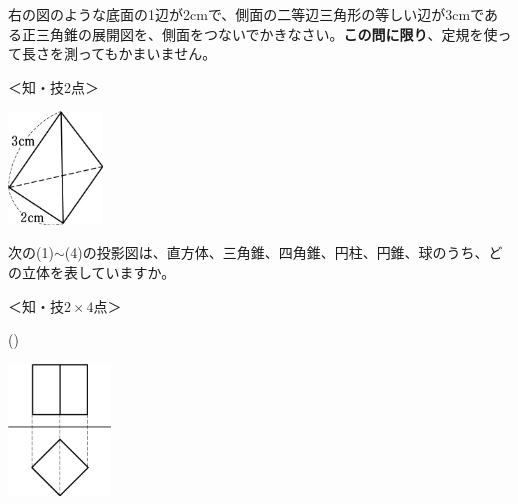 \documentclass[
  12pt,a4paper,lualatex,ja=standard]{bxjsarticle}
\begin{document}
\begin{flushleft}
\vspace{10mm}

\newpage

\setcounter{skaunta}{0}

\begin{multicols}{2}

\noindent{} \hspace{1pt}右の図のような底面の1辺が2cmで、側面の二等辺三角形の等しい辺が3cmである正三角錐の展開図を、側面をつないでかきなさい。\textbf{この問に限り}、定規を使って長さを測ってもかまいません。

%
\begin{flushright}%
\footnotesize{＜知・技2点＞}%
\end{flushright}%


\columnbreak

\begin{center}
\def\@captype{figure}
\includegraphics[height=30mm]{img/img2.jpg}

\end{center}

\end{multicols}

\vfill

\setcounter{skaunta}{0}
\noindent{} \hspace{1pt}次の(1)$\sim$(4)の投影図は、直方体、三角錐、四角錐、円柱、円錐、球のうち、どの立体を表していますか。

%
\begin{flushright}%
\footnotesize{＜知・技$2 \times 4$点＞}%
\end{flushright}%


\begin{multicols}{2}
()\hspace{2.5pt}

\begin{center}
\def\@captype{figure}
\includegraphics[height=35mm]{img/img3.jpg}


\end{center}
\end{multicols}
\end{flushleft}
\end{document}
